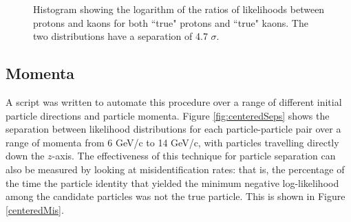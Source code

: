 \begin{figure}[]
\centering
{}
\caption[Particle identification separation for 7 GeV kaons and protons]{Histogram showing the logarithm of the ratios of likelihoods between protons and kaons for both ``true" protons and ``true" kaons. The two distributions have a separation of  4.7 $\sigma$.}
\label{fig:kaonprotonsep} 
\end{figure}

\subsection{Momenta}
A script was written to automate this procedure over a range of different initial particle directions and particle momenta. 
Figure \ref{fig:centeredSeps} shows the separation between likelihood distributions for each particle-particle pair over a range of momenta from 6 GeV/c to 14 GeV/c, with particles travelling directly down the $z$-axis.
The effectiveness of this technique for particle separation can also be measured by looking at misidentification rates: that is, the percentage of the time the particle identity that yielded the minimum negative log-likelihood among the candidate particles was not the true particle.
This is shown in Figure \ref{centeredMis}.

